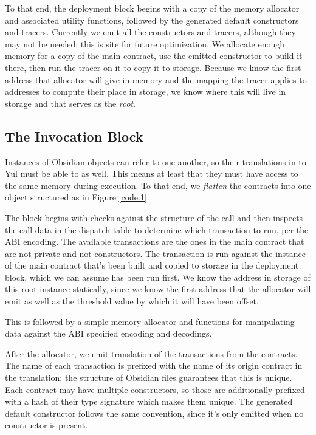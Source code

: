 To that end, the deployment block begins with a copy of the memory
allocator and associated utility functions, followed by the generated
default constructors and tracers. Currently we emit all the constructors
and tracers, although they may not be needed; this is site for future
optimization. We allocate enough memory for a copy of the main contract,
use the emitted constructor to build it there, then run the tracer on it to
copy it to storage. Because we know the first address that allocator will
give in memory and the mapping the tracer applies to addresses to compute
their place in storage, we know where this will live in storage and that
serves as the \emph{root}.

\subsection{The Invocation Block}

Instances of Obsidian objects can refer to one another, so their
translations in to Yul must be able to as well. This means at least that
they must have access to the same memory during execution. To that end, we
\emph{flatten} the contracts into one object structured as in Figure
\ref{code.1}.

The block begins with checks against the structure of the call and then
inspects the call data in the dispatch table to determine which transaction
to run, per the ABI encoding. The available transactions are the ones in
the main contract that are not private and not constructors. The
transaction is run against the instance of the main contract that's been
built and copied to storage in the deployment block, which we can assume
has been run first. We know the address in storage of this root instance
statically, since we know the first address that the allocator will emit as
well as the threshold value by which it will have been offset.

This is followed by a simple memory allocator and functions for
manipulating data against the ABI specified encoding and decodings.

After the allocator, we emit translation of the transactions from the
contracts. The name of each transaction is prefixed with the name of its
origin contract in the translation; the structure of Obsidian files
guarantees that this is unique. Each contract may have multiple
constructors, so those are additionally prefixed with a hash of their type
signature which makes them unique. The generated default constructor
follows the same convention, since it's only emitted when no constructor is
present.

